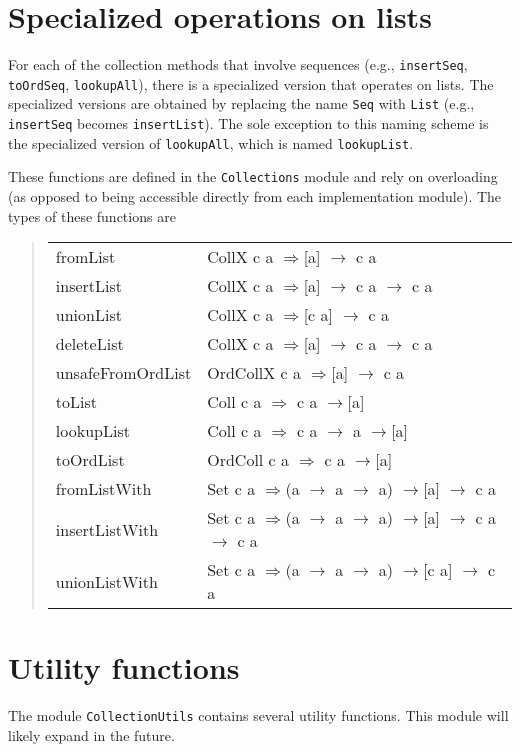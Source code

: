 \documentclass{report}
\newcommand{\cd}{\texttt}
\newcommand{\arrow}{\ensuremath{\rightarrow}\xspace}
\newcommand{\Arrow}{\ensuremath{\Rightarrow}\xspace}
\newcommand{\is}{:$\!$:$$\xspace}
\begin{document}
\section{Specialized operations on lists}

For each of the collection methods that involve sequences (e.g.,
\cd{insertSeq}, \cd{toOrdSeq}, \cd{lookupAll}), there is a specialized
version that operates on lists.  The specialized versions are obtained by
replacing the name \cd{Seq} with \cd{List} (e.g., \cd{insertSeq} becomes
\cd{insertList}).  The sole exception to this naming scheme is the
specialized version of \cd{lookupAll}, which is named \cd{lookupList}.

These functions are defined in the \cd{Collections} module and rely
on overloading (as opposed to being accessible directly from each
implementation module).  The types of these functions are
\begin{quote}\ttfamily
\begin{tabular}{l@{$\;$\is}l}
fromList          & CollX c a \Arrow [a] \arrow c a \\
insertList        & CollX c a \Arrow [a] \arrow c a \arrow c a \\
unionList         & CollX c a \Arrow [c a] \arrow c a \\
deleteList        & CollX c a \Arrow [a] \arrow c a \arrow c a \\
unsafeFromOrdList & OrdCollX c a \Arrow [a] \arrow c a \\
toList            & Coll c a \Arrow c a \arrow [a] \\
lookupList        & Coll c a \Arrow c a \arrow a \arrow [a] \\
toOrdList         & OrdColl c a \Arrow c a \arrow [a] \\
fromListWith      & Set c a \Arrow (a \arrow a \arrow a) \arrow [a] \arrow c a \\
insertListWith    & Set c a \Arrow (a \arrow a \arrow a) \arrow [a] \arrow c a \arrow c a \\
unionListWith     & Set c a \Arrow (a \arrow a \arrow a) \arrow [c a] \arrow c a
\end{tabular}
\end{quote}

\section{Utility functions}

The module \cd{CollectionUtils} contains several utility functions.
This module will likely expand in the future.
\end{document}
